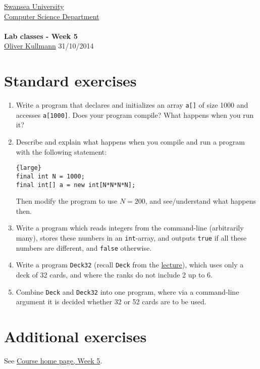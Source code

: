 \documentclass[11pt]{article}
\newcommand{\Java}{\lstset{language=Java,keywordstyle=\bfseries,breaklines,breakindent=30pt}}
\begin{document}
\begin{center}
  \href{http://www.swan.ac.uk/}{Swansea University}\\
  \href{http://www.swan.ac.uk/compsci/}{Computer Science Department}\\[1ex]
  \href{\chp}{\module}\\[1ex]
  \textbf{Lab classes - Week 5}\\
  \href{http://cs.swan.ac.uk/~csoliver}{Oliver Kullmann} 31/10/2014
\end{center}

\section{Standard exercises}
\label{sec:stdex}

\Java

\begin{enumerate}
\item Write a program that declares and initializes an array \texttt{a[]} of size 1000 and accesses \texttt{a[1000]}. Does your program compile? What happens when you run it?
\item Describe and explain what happens when you compile and run a program with the following statement:
  \begin{lstlisting}{large}
final int N = 1000;
final int[] a = new int[N*N*N*N];
  \end{lstlisting}
  Then modify the program to use $N = 200$, and see/understand what happens then.
\item Write a program which reads integers from the command-line (arbitrarily many), stores these numbers in an \texttt{int}-array, and outputs \texttt{true} if all these numbers are different, and \texttt{false} otherwise.
\item Write a program \texttt{Deck32} (recall \texttt{Deck} from the \href{http://cs.swan.ac.uk/~csoliver/ProgrammingJava201415_MgQxuCUrrS/index.html#LecturesWeek05}{lecture}), which uses only a deck of 32 cards, and where the ranks do not include 2 up to 6.
\item Combine \texttt{Deck} and \texttt{Deck32} into one program, where via a command-line argument it is decided whether 32 or 52 cards are to be used.
\end{enumerate}


\section{Additional exercises}
\label{sec:addex}

See \href{\chp#ExercisesWeek05}{Course home page, Week 5}.
\end{document}
